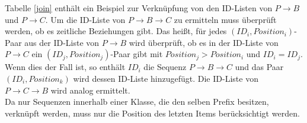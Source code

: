 \noindent Tabelle \ref{join} enthält ein Beispiel zur Verknüpfung von den ID-Listen von $P\rightarrow B$ und $P\rightarrow C$. Um die ID-Liste von $P\rightarrow B\rightarrow C$ zu ermitteln muss überprüft werden, ob es zeitliche Beziehungen gibt. Das heißt, für jedes $(ID_i,Position_i)$-Paar aus der ID-Liste von $P\rightarrow B$ wird überprüft, ob es in der ID-Liste von $P\rightarrow C$ ein $(ID_j,Position_j)$-Paar gibt mit $Position_j > Position_i$ und $ID_i = ID_j$. Wenn dies der Fall ist, so enthält $ID_i$ die Sequenz $P\rightarrow B\rightarrow C$ und das Paar $(ID_i, Position_k)$ wird dessen ID-Liste hinzugefügt. Die ID-Liste von $P\rightarrow C\rightarrow B$ wird analog ermittelt.\\
Da nur Sequenzen innerhalb einer Klasse, die den selben Prefix besitzen, verknüpft werden, muss nur die Position des letzten Items berücksichtigt werden.

